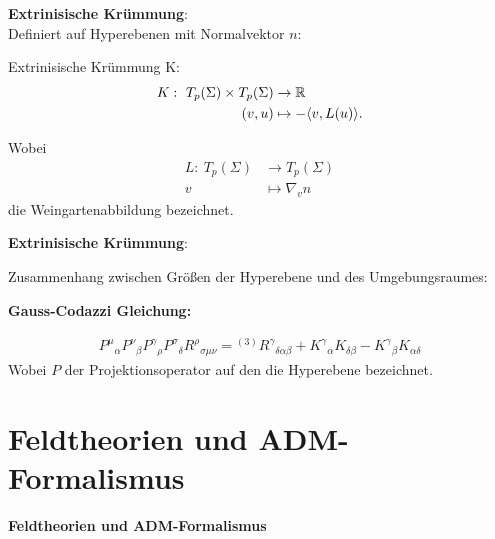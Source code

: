 \documentclass[mathserif]{beamer}
\newcommand{\inHS}{{}^{(3)}\!}
\theoremstyle{definition}
\begin{document}
	\begin{frame}
		\textbf{Extrinisische Krümmung}:\\
				Definiert auf Hyperebenen mit Normalvektor $n$:
				\begin{definition} Extrinisische Krümmung K:
					\begin{align}
						K:\ T_p(\Sigma)\times T_p(\Sigma)&\rightarrow \mathbb{R} \label{def:extrcurv} \\
							(v,u)&\mapsto -\langle v,L(u)\rangle.\notag
					\end{align}
				\end{definition}
				Wobei
				\begin{align*}
					L:\ T_p(\Sigma)&\rightarrow T_p(\Sigma) \\
						v&\mapsto \nabla_v n
				\end{align*}
				die Weingartenabbildung bezeichnet.
	\end{frame}
	\begin{frame}
		\textbf{Extrinisische Krümmung}:\\
				\begin{center}
					
				\end{center}
	\end{frame}
	\begin{frame}
		Zusammenhang zwischen Größen der Hyperebene und des Umgebungsraumes:
		\begin{center}
			\textbf{Gauss-Codazzi Gleichung:}
		\end{center}
		\begin{align}
			{P^\mu}_\alpha{P^\nu}_\beta{P^\gamma}_\rho{P^\sigma}_\delta {R^\rho}_{\sigma\mu\nu}={\inHS R^\gamma}_{\delta\alpha\beta}+{K^\gamma}_\alpha K_{\delta\beta}-{K^\gamma}_\beta K_{\alpha\delta}
		\end{align}
		Wobei $P$ der Projektionsoperator auf den die Hyperebene bezeichnet.
	\end{frame}
\section{Feldtheorien und ADM-Formalismus}
\begin{frame}
\begin{center}
	\large \textbf{Feldtheorien und ADM-Formalismus}
\end{center}
\end{frame}
\end{document}
